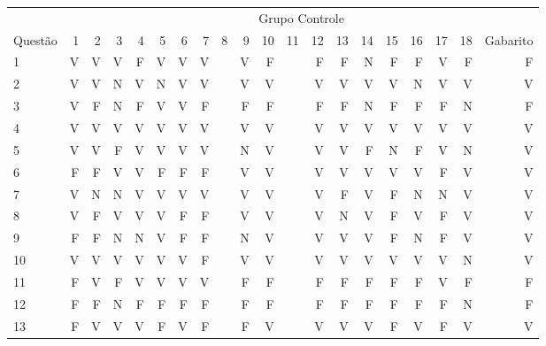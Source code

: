 \begin{apendicesenv}
\begin{center}
	\hspace*{-1.4cm}
	\begin{tabular}{ l r r r r r r r r r r r r r r r r r r r}
	\hline
	& \multicolumn{19}{c}{Grupo Controle}\\
	\cline{2 - 19} %
	\multirow[c]{-2}{*}{Questão} & \textcolor[rgb]{0.9,0,0}{1} & \textcolor[rgb]{0,0,0.9}{2} & \textcolor[rgb]{0.9,0,0}{3} & \textcolor[rgb]{0.9,0,0}{4} & \textcolor[rgb]{0.9,0,0}{5} & \textcolor[rgb]{0.9,0,0}{6} & \textcolor[rgb]{0.9,0,0}{7} & \textcolor[rgb]{0.9,0,0}{8} & \textcolor[rgb]{0.9,0,0}{9} & \textcolor[rgb]{0.9,0,0}{10} & \textcolor[rgb]{0,0,0.9}{11} & \textcolor[rgb]{0.9,0,0}{12} & \textcolor[rgb]{0,0,0.9}{13} & \textcolor[rgb]{0,0,0.9}{14} & \textcolor[rgb]{0.9,0,0}{15} & \textcolor[rgb]{0.9,0,0}{16} & \textcolor[rgb]{0.9,0,0}{17} & \textcolor[rgb]{0,0,0.9}{18} & Gabarito\\
	\hline
	1	&	V	&	V	&	V	&	F	&	V	&	V	&	V	&       &	V	&	F	&       &	F	&	F	&	N	&	F	&	F	&	V	&	F	&	F	\\
	2	&	V	&	V	&	N	&	V	&	N	&	V	&	V	&       &	V	&	V	&       &	V	&	V	&	V	&	V	&	N	&	V	&	V	&	V	\\
	3	&	V	&	F	&	N	&	F	&	V	&	V	&	F	&       &	F	&	F	&       &	F	&	F	&	N	&	F	&	F	&	F	&	N	&	F	\\
	4	&	V	&	V	&	V	&	V	&	V	&	V	&	V	&       &	V	&	V	&       &	V	&	V	&	V	&	V	&	V	&	V	&	V	&	V	\\
	5	&	V	&	V	&	F	&	V	&	V	&	V	&	V	&       &	N	&	V	&       &	V	&	V	&	F	&	N	&	F	&	V	&	N	&	V	\\
	6	&	F	&	F	&	V	&	V	&	F	&	F	&	F	&       &	V	&	V	&       &	V	&	V	&	V	&	V	&	V	&	F	&	V	&	V	\\
	7	&	V	&	N	&	N	&	V	&	V	&	V	&	V	&       &	V	&	V	&       &	V	&	F	&	V	&	F	&	N	&	N	&	V	&	V	\\
	8	&	V	&	F	&	V	&	V	&	V	&	F	&	F	&       &	V	&	V	&       &	V	&	N	&	V	&	F	&	V	&	F	&	V	&	V	\\
	9	&	F	&	F	&	N	&	N	&	V	&	F	&	F	&       &	N	&	V	&       &	V	&	V	&	V	&	F	&	N	&	F	&	V	&	V	\\
	10	&	V	&	V	&	V	&	V	&	V	&	V	&	F	&       &	V	&	V	&       &	V	&	V	&	V	&	V	&	V	&	V	&	N	&	V	\\
	11	&	F	&	V	&	F	&	V	&	V	&	V	&	V	&       &	F	&	F	&       &	F	&	F	&	F	&	F	&	F	&	V	&	F	&	F	\\
	12	&	F	&	F	&	N	&	F	&	F	&	F	&	F	&       &	F	&	F	&       &	F	&	F	&	F	&	F	&	F	&	F	&	N	&	F	\\
	13	&	F	&	V	&	V	&	V	&	F	&	V	&	F	&       &	F	&	V	&       &	V	&	V	&	V	&	F	&	V	&	F	&	V	&	V	\\

\end{tabular}
\end{center}
\end{apendicesenv}
